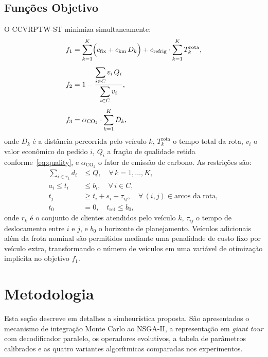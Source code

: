 \documentclass[a4paper,11pt]{article}
\begin{document}
\subsection{Funções Objetivo}

O CCVRPTW-ST minimiza simultaneamente:
%
\begin{align}
  f_1 &= \sum_{k=1}^K \Bigl( c_{\mathrm{fix}} + c_{\mathrm{km}}\,D_k \Bigr)
         + c_{\mathrm{refrig}} \cdot \sum_{k=1}^K T_k^{\mathrm{rota}},
         \label{eq:f1} \\[4pt]
  f_2 &= 1 - \frac{\displaystyle\sum_{i \in C} v_i\,Q_i}
                  {\displaystyle\sum_{i \in C} v_i},
         \label{eq:f2} \\[4pt]
  f_3 &= \alpha_{\mathrm{CO_2}} \cdot \sum_{k=1}^K D_k,
         \label{eq:f3}
\end{align}
%
onde $D_k$ é a dist\^ancia percorrida pelo veículo $k$, $T_k^{\mathrm{rota}}$
o tempo total da rota, $v_i$ o valor econ\^omico do pedido $i$, $Q_i$ a fração
de qualidade retida conforme~\eqref{eq:quality}, e $\alpha_{\mathrm{CO_2}}$ o
fator de emissão de carbono.
As restrições são:
%
\begin{align}
  \sum_{i \in r_k} d_i &\leq Q, \quad \forall\, k = 1,\ldots,K,
  \label{eq:cap} \\[3pt]
  a_i \leq t_i &\leq b_i, \quad \forall\, i \in C,
  \label{eq:tw} \\[3pt]
  t_j &\geq t_i + s_i + \tau_{ij}, \quad \forall\, (i,j) \in \text{arcos da rota},
  \label{eq:time} \\[3pt]
  t_0 &= 0, \quad t_{\mathrm{ret}} \leq b_0,
  \label{eq:depot}
\end{align}
%
onde $r_k$ é o conjunto de clientes atendidos pelo veículo $k$,
$\tau_{ij}$ o tempo de deslocamento entre $i$ e $j$,
e $b_0$ o horizonte de planejamento.
Veículos adicionais além da frota nominal são permitidos mediante
uma penalidade de custo fixo por veículo extra, transformando o número
de veículos em uma variável de otimização implícita no objetivo $f_1$.

\section{Metodologia}

Esta seção descreve em detalhes a simheurística proposta. São apresentados o mecanismo de integração Monte Carlo ao NSGA-II, a representação em \textit{giant tour} com decodificador paralelo, os operadores evolutivos, a tabela de parâmetros calibrados e as quatro variantes algorítmicas comparadas nos experimentos.
\end{document}
